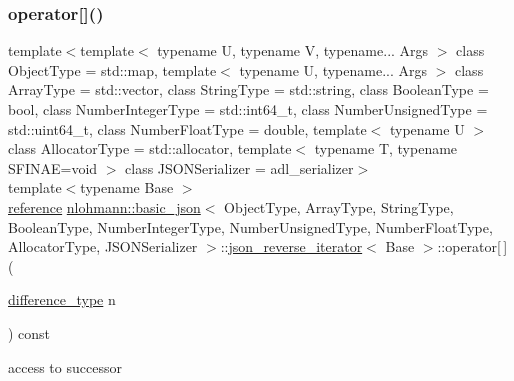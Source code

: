 \subsubsection{\texorpdfstring{operator[]()}{operator[]()}}
{\footnotesize\ttfamily template$<$template$<$ typename U, typename V, typename... Args $>$ class Object\+Type = std\+::map, template$<$ typename U, typename... Args $>$ class Array\+Type = std\+::vector, class String\+Type  = std\+::string, class Boolean\+Type  = bool, class Number\+Integer\+Type  = std\+::int64\+\_\+t, class Number\+Unsigned\+Type  = std\+::uint64\+\_\+t, class Number\+Float\+Type  = double, template$<$ typename U $>$ class Allocator\+Type = std\+::allocator, template$<$ typename T, typename S\+F\+I\+N\+A\+E=void $>$ class J\+S\+O\+N\+Serializer = adl\+\_\+serializer$>$ \\
template$<$typename Base $>$ \\
\hyperlink{classnlohmann_1_1basic__json_1_1json__reverse__iterator_ab0021ef2007fd338615360af404dcd4e}{reference} \hyperlink{classnlohmann_1_1basic__json}{nlohmann\+::basic\+\_\+json}$<$ Object\+Type, Array\+Type, String\+Type, Boolean\+Type, Number\+Integer\+Type, Number\+Unsigned\+Type, Number\+Float\+Type, Allocator\+Type, J\+S\+O\+N\+Serializer $>$\+::\hyperlink{classnlohmann_1_1basic__json_1_1json__reverse__iterator}{json\+\_\+reverse\+\_\+iterator}$<$ Base $>$\+::operator\mbox{[}$\,$\mbox{]} (\begin{DoxyParamCaption}\item[{\hyperlink{classnlohmann_1_1basic__json_afe7c1303357e19cea9527af4e9a31d8f}{difference\+\_\+type}}]{n }\end{DoxyParamCaption}) const\hspace{0.3cm}{\ttfamily [inline]}}



access to successor 

\mbox{\label{classnlohmann_1_1basic__json_1_1json__reverse__iterator_af51506d91ecf911c97521e10a047c841}} 
